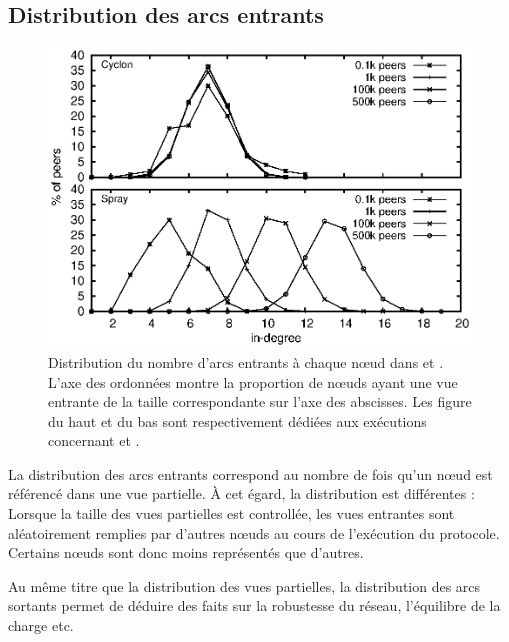 \subsection{Distribution des arcs entrants}
\label{net:subsec:inview}

\begin{figure}
  \centering
  \includegraphics[width=.8\textwidth]{img/spray/histo.eps}
  \caption{\label{net:fig:inview} Distribution du nombre d'arcs entrants à
    chaque nœud dans \CYCLON et \SPRAY. L'axe des ordonnées montre la proportion
    de nœuds ayant une vue entrante de la taille correspondante sur l'axe des
    abscisses. Les figure du haut et du bas sont respectivement dédiées aux
    exécutions concernant \CYCLON et \SPRAY.}
\end{figure}

La distribution des arcs entrants correspond au nombre de fois qu'un nœud est
référencé dans une vue partielle. À cet égard, la distribution est différentes :
Lorsque la taille des vues partielles est controllée, les vues entrantes sont
aléatoirement remplies par d'autres nœuds au cours de l'exécution du
protocole. Certains nœuds sont donc moins représentés que d'autres.

Au même titre que la distribution des vues partielles, la distribution des arcs
sortants permet de déduire des faits sur la robustesse du réseau, l'équilibre de
la charge etc. 

